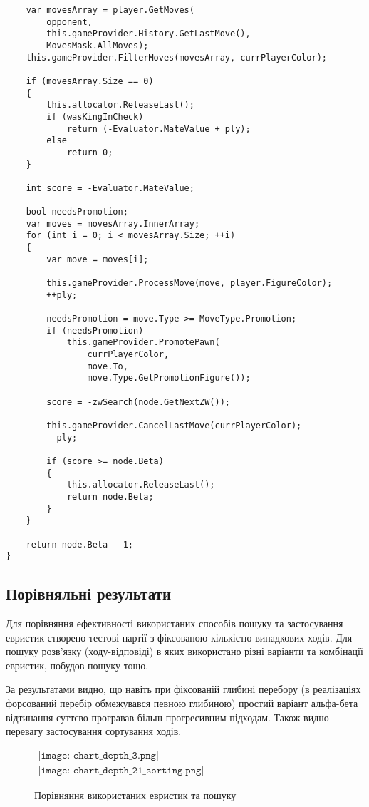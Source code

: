\documentclass[12pt,a4paper]{article}
\begin{document}
\begin{lstlisting}
    var movesArray = player.GetMoves(
        opponent, 
        this.gameProvider.History.GetLastMove(), 
        MovesMask.AllMoves);
    this.gameProvider.FilterMoves(movesArray, currPlayerColor);

    if (movesArray.Size == 0)
    {
        this.allocator.ReleaseLast();
        if (wasKingInCheck)
            return (-Evaluator.MateValue + ply);
        else
            return 0;
    }

    int score = -Evaluator.MateValue;

    bool needsPromotion;
    var moves = movesArray.InnerArray;
    for (int i = 0; i < movesArray.Size; ++i)
    {
        var move = moves[i];

        this.gameProvider.ProcessMove(move, player.FigureColor);
        ++ply;

        needsPromotion = move.Type >= MoveType.Promotion;
        if (needsPromotion)
            this.gameProvider.PromotePawn(
                currPlayerColor, 
                move.To, 
                move.Type.GetPromotionFigure());

        score = -zwSearch(node.GetNextZW());

        this.gameProvider.CancelLastMove(currPlayerColor);
        --ply;

        if (score >= node.Beta)
        {
            this.allocator.ReleaseLast();
            return node.Beta;
        }
    }

    return node.Beta - 1;
}
\end{lstlisting}

\fontsize{14pt}{6mm}\selectfont

\subsection{Порівняльні результати}

Для порівняння ефективності використаних способів пошуку та застосування
евристик створено тестові партії з фіксованою кількістю випадкових ходів. Для
пошуку розв'язку (ходу-відповіді) в яких використано різні варіанти  та
комбінації евристик, побудов пошуку тощо.

За результатами видно, що навіть при фіксованій глибині перебору (в
реалізаціях форсований перебір обмежувався певною глибиною) простий варіант
альфа-бета відтинання суттєво програвав більш прогресивним підходам. Також
видно перевагу застосування сортування ходів.

\begin{figure}[h!]
  \begin{center}$
    \begin{array}{cc}
      \texttt{[image: chart\_depth\_3.png]}\\
      \texttt{[image: chart\_depth\_21\_sorting.png]}
    \end{array}$
  \end{center}
  \caption{Порівняння використаних евристик та пошуку}
\end{figure}
\end{document}
